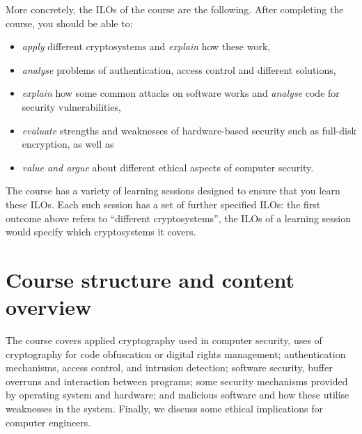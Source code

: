 More concretely, the \acp{ILO} of the course are the following.
After completing the course, you should be able to:
\begin{frame}
\begin{itemize}

  \item \emph{apply} different cryptosystems and \emph{explain} how these work,

  \item \emph{analyse} problems of authentication, access control and different 
    solutions,

  \item \emph{explain} how some common attacks on software works and 
    \emph{analyse} code for security vulnerabilities,

  \item \emph{evaluate} strengths and weaknesses of hardware-based security 
    such as full-disk encryption, as well as

  \item \emph{value and argue} about different ethical aspects of computer 
    security.

\end{itemize}
\end{frame}
The course has a variety of learning sessions designed to ensure that you learn 
these \acp{ILO}.
Each such session has a set of further specified \acp{ILO}:
\eg the first outcome above refers to \enquote{different cryptosystems}, the 
\acp{ILO} of a learning session would specify which cryptosystems it covers.


\section{Course structure and content overview}%
\label{sec:outline}


The course covers
applied cryptography used in computer security, \eg uses of cryptography for 
code obfuscation or digital rights management;
authentication mechanisms, access control, and intrusion detection;
software security, \eg buffer overruns and interaction between programs;
some security mechanisms provided by operating system and hardware;
and malicious software and how these utilise weaknesses in the system.
Finally, we discuss some ethical implications for computer engineers.

